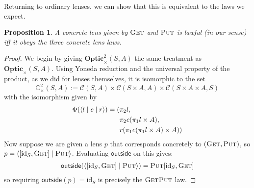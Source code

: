 \documentclass[11pt,letterpaper]{article}
\theoremstyle{plain}
\newtheorem{proposition}[theorem]{Proposition}
\theoremstyle{definition}
\newcommand{\C}{\mathscr{C}}
\newcommand{\Optic}{\mathbf{Optic}}
\newcommand{\Twoptic}{\mathbf{Optic}^2}
\newcommand{\conctwice}{\mathbb{C}^2}
\newcommand{\id}{\mathrm{id}}
\newcommand{\rep}[2]{{\ensuremath \left\langle #1 \mid #2 \right\rangle}}
\newcommand{\repthree}[3]{{\ensuremath \langle #1 \mid #2 \mid #3 \rangle}}
\newcommand{\fget}{\textsc{Get}}
\newcommand{\fput}{\textsc{Put}}
\newcommand{\outside}{\mathsf{outside}}
\begin{document}
Returning to ordinary lenses, we can show that this is equivalent to the laws we expect.
 
\begin{proposition}\label{prop:lawful-lens-laws}
  A concrete lens given by $\fget$ and $\fput$ is lawful (in our sense) iff it obeys the three concrete lens laws.
\end{proposition}
\begin{proof}
  We begin by giving $\Twoptic_\times(S, A)$ the same treatment as $\Optic_\times(S, A)$. Using Yoneda reduction and the universal property of the product, as we did for lenses themselves, it is isomorphic to the set
  \[\conctwice_\times(S, A) := \C(S, A) \times \C(S \times A, A) \times \C(S \times A \times A, S)\]
  with the isomorphism given by
  \begin{align*}
    \Phi(\repthree{l}{c}{r}) = (&\pi_2 l, \\
                                   &\pi_2 c (\pi_1 l \times A), \\
                                   &r(\pi_1 c (\pi_1 l \times A) \times A))
  \end{align*}
  Now suppose we are given a lens $p$ that corresponds concretely to $(\fget, \fput)$, so $p = \rep{[\id_S, \fget]}{\fput}$. Evaluating $\outside$ on this gives:
  \begin{align*}
    \outside(\rep{[\id_S, \fget]}{\fput}) = \fput [\id_S, \fget]
  \end{align*}
  so requiring $\outside(p) = \id_S$ is precisely the $\fget\fput$ law.


\end{proof}
\end{document}
